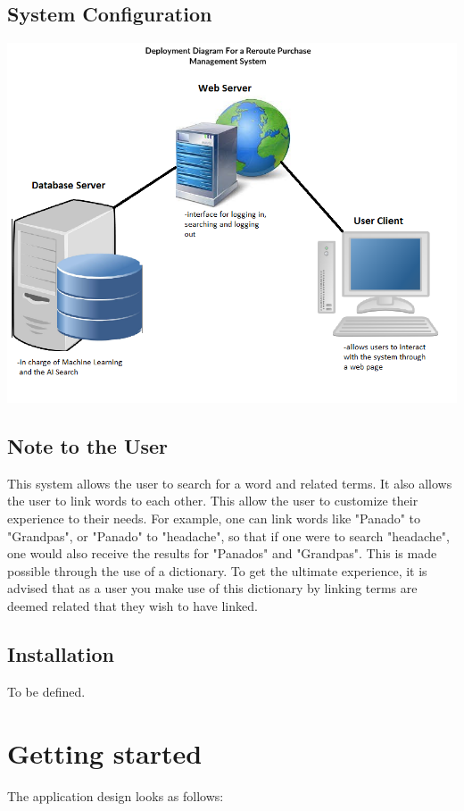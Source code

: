 \documentclass[a4paper,10pt]{article}
\begin{document}
\subsection{System Configuration}
	{\centering\includegraphics[width=15cm, scale=0.5]{User Manual Deployment diagram.png}} \\

\subsection{Note to the User}
This system allows the user to search for a word and related terms. It also allows the user to link words to each other. This allow the user to customize their experience to their needs. For example, one can link words like "Panado" to "Grandpas", or "Panado" to "headache", so that if one were to search "headache", one would also receive the results for "Panados" and "Grandpas". This is made possible through the use of a dictionary. To get the ultimate experience, it is advised that as a user you make use of this dictionary by linking terms are deemed related that they wish to have linked.

\subsection{Installation}
To be defined.

\section{Getting started}
	The application design looks as follows: \\
\end{document}
